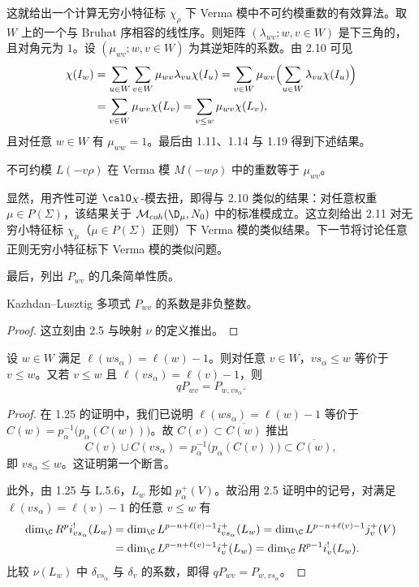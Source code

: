 这就给出一个计算无穷小特征标 $\chi_\rho$ 下 Verma 模中不可约模重数的有效算法。取 $W$ 上的一个与 Bruhat 序相容的线性序。则矩阵 $(\lambda_{wv};w,v\in W)$ 是下三角的，且对角元为 $1$。设 $(\mu_{wv};w,v\in W)$ 为其逆矩阵的系数。由 2.10 可见
\begin{align*}
\chi(I_w)&=\sum_{u\in W}\sum_{v\in W}\mu_{wv}\lambda_{vu}\chi(I_u)
=\sum_{v\in W}\mu_{wv}\Bigl(\sum_{u\in W}\lambda_{vu}\chi(I_u)\Bigr)\\
&=\sum_{v\in W}\mu_{wv}\chi(L_v)=\sum_{v\leq w}\mu_{wv}\chi(L_v),
\end{align*}
且对任意 $w\in W$ 有 $\mu_{ww}=1$。最后由 1.11、1.14 与 1.19 得到下述结果。

\begin{corollary}\label{cor:05.2.11}
不可约模 $L(-v\rho)$ 在 Verma 模 $M(-w\rho)$ 中的重数等于 $\mu_{wv}$。
\end{corollary}

显然，用齐性可逆 $\calO_X$-模去扭，即得与 2.10 类似的结果：对任意权重 $\mu\in P(\Sigma)$，该结果关于 $\mathcal{M}_{coh}(\D_\mu,N_0)$ 中的标准模成立。这立刻给出 2.11 对无穷小特征标 $\chi_\mu$（$\mu\in P(\Sigma)$ 正则）下 Verma 模的类似结果。下一节将讨论任意正则无穷小特征标下 Verma 模的类似问题。

最后，列出 $P_{wv}$ 的几条简单性质。

\begin{corollary}\label{cor:05.2.12}
Kazhdan--Lusztig 多项式 $P_{wv}$ 的系数是非负整数。
\end{corollary}

\begin{proof}
这立刻由 2.5 与映射 $\nu$ 的定义推出。
\end{proof}

\begin{lemma}\label{lem:05.2.13}
设 $w\in W$ 满足 $\ell(ws_\alpha)=\ell(w)-1$。则对任意 $v\in W$，$vs_\alpha\leq w$ 等价于 $v\leq w$。又若 $v\leq w$ 且 $\ell(vs_\alpha)=\ell(v)-1$，则
$$qP_{wv}=P_{w,vs_\alpha}.$$
\end{lemma}

\begin{proof}
在 1.25 的证明中，我们已说明 $\ell(ws_\alpha)=\ell(w)-1$ 等价于 $C(w)=p_\alpha^{-1}\bigl(p_\alpha(C(w))\bigr)$。故 $C(v)\subset\overline{C(w)}$ 推出
$$C(v)\cup C(vs_\alpha)=p_\alpha^{-1}\bigl(p_\alpha(C(v))\bigr)\subset\overline{C(w)},$$
即 $vs_\alpha\leq w$。这证明第一个断言。

此外，由 1.25 与 L.5.6，$L_w$ 形如 $p_\alpha^+(V)$。故沿用 2.5 证明中的记号，对满足 $\ell(vs_\alpha)=\ell(v)-1$ 的任意 $v\leq w$ 有
\begin{align*}
\dim_\C R^pi^!_{vs_\alpha}(L_w)
&=\dim_\C L^{p-n+\ell(v)-1}i^+_{vs_\alpha}(L_w)
=\dim_\C L^{p-n+\ell(v)-1}j^+_v(V)\\
&=\dim_\C L^{p-n+\ell(v)-1}i^+_v(L_w)
=\dim_\C R^{p-1}i^!_v(L_w).
\end{align*}
比较 $\nu(L_w)$ 中 $\delta_{vs_\alpha}$ 与 $\delta_v$ 的系数，即得 $qP_{wv}=P_{w,vs_\alpha}$。
\end{proof}

